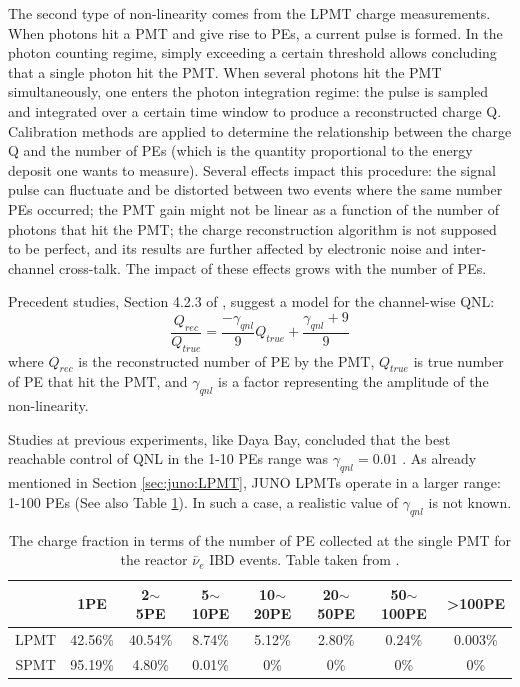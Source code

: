 \documentclass[../main.tex]{subfiles}
\begin{document}
The second type of non-linearity comes from the LPMT charge measurements. When photons hit a PMT and give rise to PEs, a current pulse is formed. In the photon counting regime, simply exceeding a certain threshold allows concluding that a single photon hit the PMT. When several photons hit the PMT simultaneously, one enters the photon integration regime: the pulse is sampled and integrated over a certain time window to produce a reconstructed charge Q. Calibration methods are applied to determine the relationship between the charge Q and the number of PEs (which is the quantity proportional to the energy deposit one wants to measure). Several effects impact this procedure: the signal pulse can fluctuate and be distorted between two events where the same number PEs occurred; the PMT gain might not be linear as a function of the number of photons that hit the PMT; the charge reconstruction algorithm is not supposed to be perfect, and its results are further affected by electronic noise and inter-channel cross-talk. The impact of these effects grows with the number of PEs.

Precedent studies, Section 4.2.3 of \cite{han_dual_2021}, suggest a model for the channel-wise QNL:
\begin{equation}
  \label{eq:joint_fit:gamma_yang}
  \frac{Q_{rec}}{Q_{true}} = \frac{-\gamma_{qnl}}{9} Q_{true} + \frac{\gamma_{qnl} + 9}{9}
\end{equation}
where $Q_{rec}$ is the reconstructed number of PE by the PMT, $Q_{true}$ is true number of PE that hit the PMT, and $\gamma_{qnl}$ is a factor representing the amplitude of the non-linearity.

Studies at previous experiments, like Daya Bay, concluded that the best reachable control of QNL in the 1-10 PEs range was $\gamma_{qnl}=0.01$ \cite{collaboration_high_2019}.
As already mentioned in Section \ref{sec:juno:LPMT}, JUNO LPMTs operate in a larger range: 1-100 PEs (See also Table \ref{tab:joint_fit:charge_frac}). In such a case, a realistic value of $\gamma_{qnl}$ is not known.

\begin{table}[ht]
  \centering
  \begin{tabular}{c|c|c|c|c|c|c|c}
        &1PE &2$\sim$5PE& 5$\sim$10PE & 10$\sim$20PE & 20$\sim$50PE & 50$\sim$100PE & >100PE \\
      \hline
    LPMT &42.56\% & 40.54\% & 8.74\% & 5.12\% & 2.80\% & 0.24\% & 0.003\% \\
    SPMT &95.19\% & 4.80\%  & 0.01\% & 0\%    & 0\%    & 0\%    & 0\% \\
    \hline
  \end{tabular}
  \caption{The charge fraction in terms of the number of PE collected at the single PMT for the reactor $\bar{\nu}_e$ IBD events. Table taken from \cite{han_dual_2021}.}
  \label{tab:joint_fit:charge_frac}
\end{table}
\end{document}
